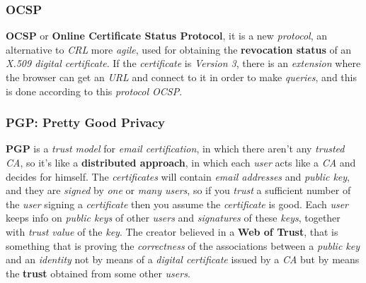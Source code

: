 \documentclass{article}
\begin{document}
\subsubsection{OCSP}
\textbf{OCSP} or \textbf{Online Certificate Status Protocol}, it is a new \emph{protocol}, an alternative to \emph{CRL} more \emph{agile}, used for obtaining the \textbf{revocation status} of an \emph{X.509 digital certificate}. If the \emph{certificate} is \emph{Version 3}, there is an \emph{extension} where the browser can get an \emph{URL} and connect to it in order to make \emph{queries}, and this is done according to this \emph{protocol OCSP}.
\subsubsection{PGP: Pretty Good Privacy}
\textbf{PGP} is a \emph{trust model} for \emph{email certification}, in which there aren't any \emph{trusted CA}, so it's like a \textbf{distributed approach}, in which each \emph{user} acts like a \emph{CA} and decides for himself. The \emph{certificates} will contain \emph{email addresses} and \emph{public key}, and they are \emph{signed} by \emph{one} or \emph{many users}, so if you \emph{trust} a sufficient number of the \emph{user} signing a \emph{certificate} then you assume the \emph{certificate} is good. Each \emph{user} keeps info on \emph{public keys} of other \emph{users} and \emph{signatures} of these \emph{keys}, together with \emph{trust value} of the \emph{key}. The creator believed in a \textbf{Web of Trust}, that is something that is proving the \emph{correctness} of the associations between a \emph{public key} and an \emph{identity} not by means of a \emph{digital certificate} issued by a \emph{CA} but by means the \textbf{trust} obtained from some other \emph{users}. 
\end{document}
